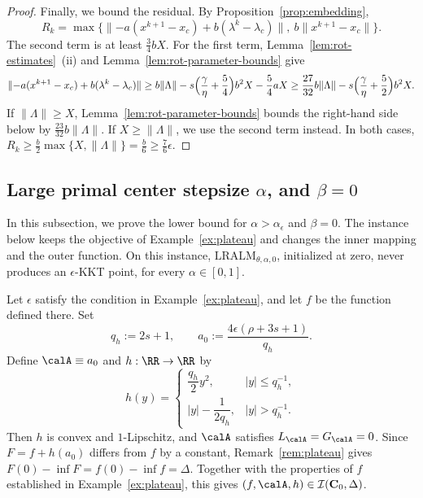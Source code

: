 \begin{proof}
Finally, we bound the residual. By Proposition~\ref{prop:embedding},
\[
R_k=\max\bigl\{\|{-a}(x^{k+1}-x_c)+b(\lambda^k-\lambda_c)\|,\
b\|x^{k+1}-x_c\|\bigr\}.
\]
The second term is at least \(\frac34bX\). For the first term,
Lemma~\ref{lem:rot-estimates}~(ii) and Lemma~\ref{lem:rot-parameter-bounds} give
\[
\|{-a}(x^{k+1}-x_c)+b(\lambda^k-\lambda_c)\|
\ge b\|\Lambda\|-s\Bigl(\frac{\gamma}{\eta}+\frac54\Bigr)b^2X-\frac54aX
\ge\frac{27}{32}b\|\Lambda\|-s\Bigl(\frac{\gamma}{\eta}+\frac52\Bigr)b^2X .
\]
If \(\|\Lambda\|\ge X\), Lemma~\ref{lem:rot-parameter-bounds} bounds the
right-hand side below by \(\frac{23}{32}b\|\Lambda\|\). If
\(X\ge\|\Lambda\|\), we use the second term instead. In both cases,
\(R_k\ge\frac b2\max\{X,\|\Lambda\|\}=\frac b6\ge\frac76\epsilon\).
\end{proof}
 


\subsection{Large primal center stepsize \texorpdfstring{$\alpha$}{alpha}, and \texorpdfstring{$\beta=0$}{beta=0}}
\label{subsec:lb-huber}

In this subsection, we prove the lower bound for \(\alpha>\alpha_\epsilon\)
and \(\beta=0\). The instance below keeps the objective of
Example~\ref{ex:plateau} and changes the inner mapping and the outer
function. On this instance, \(\mathrm{LRALM}_{\theta,\alpha,0}\), initialized
at zero, never produces an \(\epsilon\)-KKT point, for every
\(\alpha\in[0,1]\).

\begin{example}
\label{ex:huber}
Let \(\epsilon\) satisfy the condition in Example~\ref{ex:plateau}, and let
\(f\) be the function defined there. Set
\[
q_h:=2s+1,
\qquad
a_0:=\frac{4\epsilon(\rho+3s+1)}{q_h}.
\]
Define \(\calA\equiv a_0\) and \(h:\RR\to\RR\) by
\[
h(y)=
\begin{cases}
\dfrac{q_h}{2}y^2, & |y|\le q_h^{-1},\\[4pt]
|y|-\dfrac{1}{2q_h}, & |y|>q_h^{-1}.
\end{cases}
\]
Then \(h\) is convex and \(1\)-Lipschitz, and \(\calA\) satisfies
\(L_{\calA}=G_{\calA}=0\). Since \(F=f+h(a_0)\) differs from \(f\) by a
constant, Remark~\ref{rem:plateau} gives
\(F(0)-\inf F=f(0)-\inf f=\Delta\). Together with the properties of \(f\)
established in Example~\ref{ex:plateau}, this gives
\((f,\calA,h)\in\mathcal I(\mathbf C_0,\Delta)\).
\end{example}

